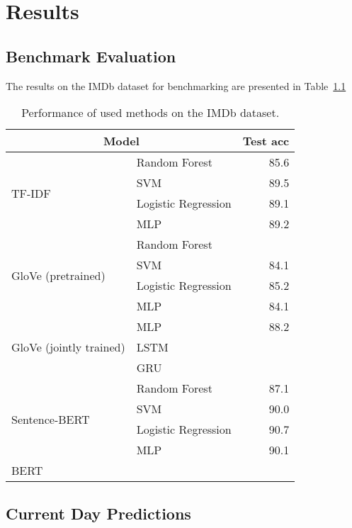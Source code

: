 \chapter{Results}

\section{Benchmark Evaluation}

The results on the IMDb dataset for benchmarking are presented in Table~\ref{tab:imdb}


\begin{table}[h]
    \centering
    \begin{tabular}{llr}
    \hline
        \multicolumn{2}{c}{\textbf{Model}} & \textbf{Test acc} \\
        \hline \hline   
        \multirow{4}{*}{TF-IDF} & Random Forest & 85.6 \\
        & SVM & 89.5 \\
        & Logistic Regression & 89.1 \\
        & MLP & 89.2 \\
        \hline 
        \multirow{4}{*}{GloVe (pretrained)} & Random Forest & \\
        & SVM & 84.1 \\
        & Logistic Regression & 85.2 \\
        & MLP & 84.1 \\
        \hline 
        \multirow{3}{*}{GloVe (jointly trained)} & MLP & 88.2 \\
        & LSTM & \\
        & GRU & \\
        \hline 
        \multirow{4}{*}{Sentence-BERT} & Random Forest & 87.1 \\
        & SVM & 90.0 \\
        & Logistic Regression & 90.7 \\
        & MLP & 90.1 \\
        \hline
        BERT & &  \\
        \hline
    \end{tabular}
\caption{Performance of used methods on the IMDb dataset.}
\label{tab:imdb}
\end{table}


\section{Current Day Predictions}

